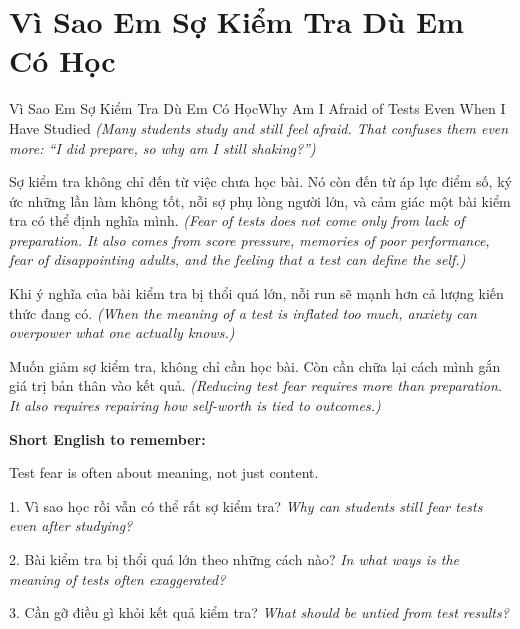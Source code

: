 \section{Vì Sao Em Sợ Kiểm Tra Dù Em Có Học}
\begin{truyen}{Vì Sao Em Sợ Kiểm Tra Dù Em Có Học}{Why Am I Afraid of Tests Even When I Have Studied}
\textit{(Many students study and still feel afraid. That confuses them even more: “I did prepare, so why am I still shaking?”)}

Sợ kiểm tra không chỉ đến từ việc chưa học bài. Nó còn đến từ áp lực điểm số, ký ức những lần làm không tốt, nỗi sợ phụ lòng người lớn, và cảm giác một bài kiểm tra có thể định nghĩa mình.
\textit{(Fear of tests does not come only from lack of preparation. It also comes from score pressure, memories of poor performance, fear of disappointing adults, and the feeling that a test can define the self.)}

Khi ý nghĩa của bài kiểm tra bị thổi quá lớn, nỗi run sẽ mạnh hơn cả lượng kiến thức đang có.
\textit{(When the meaning of a test is inflated too much, anxiety can overpower what one actually knows.)}
\end{truyen}

\begin{baihoc}
Muốn giảm sợ kiểm tra, không chỉ cần học bài. Còn cần chữa lại cách mình gắn giá trị bản thân vào kết quả.
\textit{(Reducing test fear requires more than preparation. It also requires repairing how self-worth is tied to outcomes.)}
\end{baihoc}

\begin{ghinhoanh}
\textbf{Short English to remember:}

Test fear is often about meaning, not just content.

\end{ghinhoanh}

\begin{tuhocnhanh}
1. Vì sao học rồi vẫn có thể rất sợ kiểm tra? \textit{Why can students still fear tests even after studying?}

2. Bài kiểm tra bị thổi quá lớn theo những cách nào? \textit{In what ways is the meaning of tests often exaggerated?}

3. Cần gỡ điều gì khỏi kết quả kiểm tra? \textit{What should be untied from test results?}
\end{tuhocnhanh}
\ngancach

